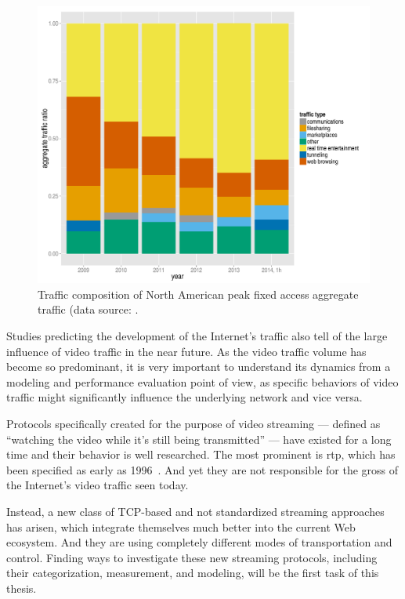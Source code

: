 \begin{figure}[htb]
    \centering
    \includegraphics[width=1.0\textwidth]{images/r-netvine-phenomena-fixed.pdf}
    \caption{Traffic composition of North American peak fixed access aggregate traffic (data source: \cite{sandvine_internetphenomena}.} %
\label{c1:fig:traffic-netvine-fixed}
\end{figure}

Studies predicting the development of the Internet's traffic also tell of the large influence of video traffic in the near future. As the video traffic volume has become so predominant, it is very important to understand its dynamics from a modeling and performance evaluation point of view, as specific behaviors of video traffic might significantly influence the underlying network and vice versa. 

Protocols specifically created for the purpose of video streaming --- defined as ``watching the video while it's still being transmitted'' --- have existed for a long time and their behavior is well researched. The most prominent is \gls{rtp}, which has been specified as early as 1996~\cite{rfc1889}. And yet they are not responsible for the gross of the Internet's video traffic seen today.

Instead, a new class of \gls{TCP}-based and not standardized streaming approaches has arisen, which integrate themselves much better into the current Web ecosystem. And they are using completely different modes of transportation and control. Finding ways to investigate these new streaming protocols, including their categorization, measurement, and modeling, will be the first task of this thesis.

